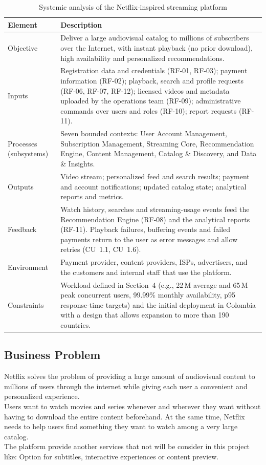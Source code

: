 \documentclass{article}
\begin{document}
\begin{table}[htbp]
\centering
\caption{Systemic analysis of the Netflix-inspired streaming platform}
\label{tab:systemic-analysis}
\small
\renewcommand{\arraystretch}{1.25}
\begin{tabularx}{\textwidth}{@{}p{2.8cm}X@{}}
\toprule
\textbf{Element} & \textbf{Description} \\
\midrule
Objective &
Deliver a large audiovisual catalog to millions of subscribers over the Internet, with instant playback (no prior download), high availability and personalized recommendations. \\
Inputs &
Registration data and credentials (RF-01, RF-03); payment information (RF-02); playback, search and profile requests (RF-06, RF-07, RF-12); licensed videos and metadata uploaded by the operations team (RF-09); administrative commands over users and roles (RF-10); report requests (RF-11). \\
Processes (subsystems) &
Seven bounded contexts: User Account Management, Subscription Management, Streaming Core, Recommendation Engine, Content Management, Catalog \& Discovery, and Data \& Insights. \\
Outputs &
Video stream; personalized feed and search results; payment and account notifications; updated catalog state; analytical reports and metrics. \\
Feedback &
Watch history, searches and streaming-usage events feed the Recommendation Engine (RF-08) and the analytical reports (RF-11). Playback failures, buffering events and failed payments return to the user as error messages and allow retries (CU~1.1, CU~1.6). \\
Environment &
Payment provider, content providers, ISPs, advertisers, and the customers and internal staff that use the platform. \\
Constraints &
Workload defined in Section~4 (e.g., 22\,M average and 65\,M peak concurrent users, 99.99\% monthly availability, p95 response-time targets) and the initial deployment in Colombia with a design that allows expansion to more than 190 countries. \\
\bottomrule
\end{tabularx}
\end{table}
 


\subsection{Business Problem}
Netflix solves the problem of providing a large amount of audiovisual content to millions of users 
through the internet while giving each user a convenient and personalized experience.
\\Users want to watch movies and series whenever and wherever they want without having to download the entire content beforehand. 
At the same time, Netflix needs to help users find something they want to watch among a very large catalog.
\\The platform provide another services that not will be consider in this project like: Option for subtitles, interactive experiences or content preview.
 
\end{document}

